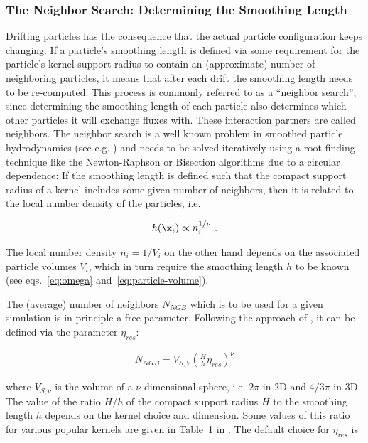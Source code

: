 \subsubsection{The Neighbor Search: Determining the Smoothing Length}

Drifting particles has the consequence that the actual particle configuration keeps changing. If a
particle's smoothing length is defined via some requirement for the particle's kernel support radius
to contain an (approximate) number of neighboring particles, it means that after each drift the
smoothing length needs to be re-computed. This process is commonly referred to as a ``neighbor
search'', since determining the smoothing length of each particle also determines which other
particles it will exchange fluxes with. These interaction partners are called neighbors. The
neighbor search is a well known problem in smoothed particle hydrodynamics (see e.g.
\cite{priceSmoothedParticleHydrodynamics2012}) and needs to be solved iteratively using a root
finding technique like the Newton-Raphson or Bisection algorithms due to a circular dependence: If
the smoothing length is defined such that the compact support radius of a kernel includes some given
number of neighbors, then it is related to the local number density of the particles, i.e.

\begin{align}
    h(\x_i) \propto n_i^{1/\nu} \ .
\end{align}

The local number density $n_i = 1/V_i$ on the other hand depends on the associated particle volumes
$V_i$, which in turn require the smoothing length $h$ to be known (see eqs.~\ref{eq:omega}
and~\ref{eq:particle-volume}).

The (average) number of neighbors $N_{NGB}$ which is to be used for a given simulation is in
principle a free parameter. Following the approach of
\citet{dehnenImprovingConvergenceSmoothed2012c}, it can be defined via the parameter $\eta_{res}$:

\begin{align}
    N_{NGB} = V_{S,V} \left( \frac{H}{h} \eta_{res} \right)^\nu \label{eq:number-of-neighbors}
\end{align}

where $V_{S,\nu}$ is the volume of a $\nu$-dimensional sphere, i.e. $2 \pi$ in 2D and $4/3 \pi$ in
3D. The value of the ratio $H/h$ of the compact support radius $H$ to the smoothing length $h$
depends on the kernel choice and dimension. Some values of this ratio for various popular kernels
are given in Table~1 in \citet{dehnenImprovingConvergenceSmoothed2012c}. The default choice for
$\eta_{res}$ is

